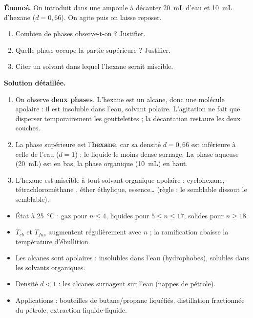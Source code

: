 \documentclass[11pt]{article}
\begin{document}
\begin{exoresolu}
\textbf{Énoncé.} On introduit dans une ampoule à décanter \SI{20}{mL} d'eau et \SI{10}{mL} d'hexane ($d = 0{,}66$). On agite puis on laisse reposer.
\begin{enumerate}
\item Combien de phases observe-t-on ? Justifier.
\item Quelle phase occupe la partie supérieure ? Justifier.
\item Citer un solvant dans lequel l'hexane serait miscible.
\end{enumerate}
\tcblower
\textbf{Solution détaillée.}
\begin{enumerate}
\item On observe \textbf{deux phases}. L'hexane est un alcane, donc une molécule apolaire : il est insoluble dans l'eau, solvant polaire. L'agitation ne fait que disperser temporairement les gouttelettes ; la décantation restaure les deux couches.
\item La phase supérieure est l'\textbf{hexane}, car sa densité $d = 0{,}66$ est inférieure à celle de l'eau ($d = 1$) : le liquide le moins dense surnage. La phase aqueuse (\SI{20}{mL}) est en bas, la phase organique (\SI{10}{mL}) en haut.
\item L'hexane est miscible à tout solvant organique apolaire : cyclohexane, tétrachlorométhane , éther éthylique, essence\ldots{} (règle : le semblable dissout le semblable).
\end{enumerate}
\end{exoresolu}

\begin{aretenir}
\begin{itemize}
\item État à \SI{25}{\celsius} : gaz pour $n \leq 4$, liquides pour $5 \leq n \leq 17$, solides pour $n \geq 18$.
\item $T_{eb}$ et $T_{fus}$ augmentent régulièrement avec $n$ ; la ramification abaisse la température d'ébullition.
\item Les alcanes sont apolaires : insolubles dans l'eau (hydrophobes), solubles dans les solvants organiques.
\item Densité $d < 1$ : les alcanes surnagent sur l'eau (nappes de pétrole).
\item Applications : bouteilles de butane/propane liquéfiés, distillation fractionnée du pétrole, extraction liquide-liquide.
\end{itemize}
\end{aretenir}
\end{document}
